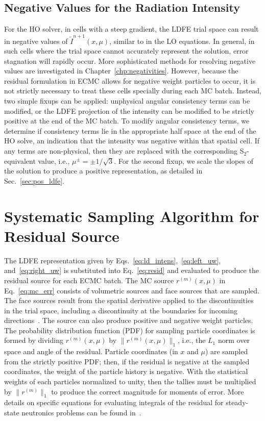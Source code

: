 \subsection{Negative Values for the Radiation Intensity}
\label{sec:ho_easyfix}

For the HO solver, in cells with a steep gradient, the LDFE trial space can result in
negative values of $\tilde{I}^{n+1}(x,\mu)$, similar to in the LO equations. In
general, in such cells where the trial space cannot accurately represent the solution,
error stagnation will rapidly occur.   More
sophisticated methods for resolving negative values are investigated in
Chapter~\ref{chp:negativities}.  However, because the residual formulation in ECMC allows
for negative weight particles to occur, it is not strictly necessary to treat these cells
specially during each MC batch.  Instead, two simple fixups can be applied: unphysical angular consistency terms can be
modified, or the LDFE projection of the intensity can be modified to be strictly positive
at the end of the MC batch.  To modify angular consistency terms, we determine if
consistency terms lie in the appropriate half space at the end of the HO solve, an
indication that the intensity was negative within that spatial cell.  If any terms are
non-physical, then they are replaced with the corresponding S$_2$-equivalent value, i.e.,
$\mu^{\pm}=\pm 1/\sqrt{3}$.  For the second fixup, we scale the slopes of the solution to
produce a positive representation, as detailed in Sec.~\ref{sec:pos_ldfe}.

\section{Systematic Sampling Algorithm for Residual Source}
\label{sec:systematic_sampling}

The LDFE representation given by Eqs.~\eqref{eq:ld_intens},~\eqref{eq:left_uw},
and~\eqref{eq:right_uw} is substituted into Eq.~\eqref{eq:resid} and evaluated
to produce the residual source for each ECMC batch.  The MC source
$r^{(m)}(x,\mu)$ in Eq.~\eqref{eq:mc_err} consists of volumetric sources and
face sources that are sampled.  The face sources result from the spatial derivative applied to
the discontinuities in the trial space, including a discontinuity at the boundaries for
incoming directions~\cite{jake}.  The source can also produce positive and
negative weight particles.  The probability distribution function (PDF) for
sampling particle coordinates is formed by dividing $r^{(m)}(x,\mu)$ by $\|r^{(m)}(x,\mu)\|_1$,
i.e., the $L_1$ norm over space and angle of the residual.  Particle coordinates (in $x$ and $\mu$)
are sampled from the strictly positive PDF; then, if the residual is negative at the sampled coordinates, the weight of the
particle history is negative. With
the statistical weights of each particles normalized to unity, then the tallies must be multiplied
by $\|r^{(m)}\|_1$ to produce the correct magnitude for moments of error.
  More details on specific equations for evaluating integrals of the
residual for steady-state neutronics problems can be found in~\cite{jake}.  
 
